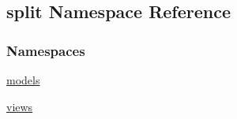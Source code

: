 \hypertarget{namespacesplit}{}\subsection{split Namespace Reference}
\label{namespacesplit}
\subsubsection*{Namespaces}
\begin{DoxyCompactItemize}
\item 
 \hyperlink{namespacesplit_1_1models}{models}
\item 
 \hyperlink{namespacesplit_1_1views}{views}
\end{DoxyCompactItemize}
